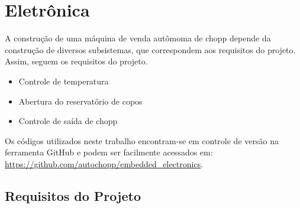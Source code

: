 \chapter[Eletrônica]{Eletrônica}
 
 A construção de uma máquina de venda autômoma de chopp depende da construção de diversos subsistemas,
 que correspondem aos requisitos do projeto. Assim, seguem os requisitos do projeto.

\begin{itemize}
\item Controle de temperatura
\item Abertura do reservatório de copos
\item Controle de saída de chopp
\end{itemize}
  
Os códigos utilizados neste trabalho encontram-se em controle de versão na ferramenta GitHub 
e podem ser facilmente acessados em: \url{https://github.com/autochopp/embedded_electronics}. 

\section{Requisitos do Projeto}

